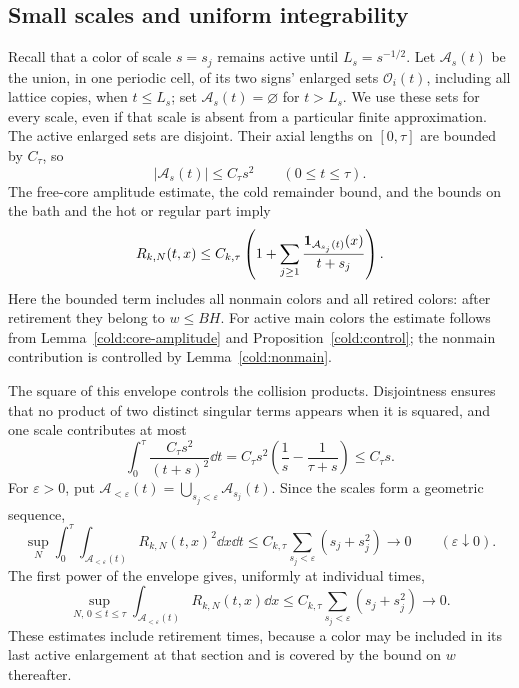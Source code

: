\subsection{Small scales and uniform integrability}

Recall that a color of scale $s=s_j$ remains active until
$L_s=s^{-1/2}$. Let $\mathcal A_s(t)$ be the union, in one periodic
cell, of its two signs' enlarged sets $\mathcal O_i(t)$, including
all lattice copies, when $t\le L_s$; set
$\mathcal A_s(t)=\varnothing$ for $t>L_s$.
We use these sets for every scale, even if that scale is absent from a
particular finite approximation. The active enlarged sets are disjoint.
Their axial lengths on $[0,\tau]$ are bounded by $C_\tau$, so
\[
 |\mathcal A_s(t)|\le C_\tau s^2
 \qquad(0\le t\le\tau).
\]
The free-core amplitude estimate, the cold remainder bound, and the
bounds on the bath and the hot or regular part imply
\begin{equation}\label{comp:moment-envelope}
 R_{k,N}(t,x)\le C_{k,\tau}
 \left(1+\sum_{j\ge1}
       \frac{\mathbf 1_{\mathcal A_{s_j}(t)}(x)}{t+s_j}\right).
\end{equation}
Here the bounded term includes all nonmain colors and all retired
colors: after retirement they belong to $w\le BH$.
For active main colors the estimate follows from
Lemma~\ref{cold:core-amplitude} and Proposition~\ref{cold:control};
the nonmain contribution is controlled by Lemma~\ref{cold:nonmain}.

The square of this envelope controls the collision products.
Disjointness ensures that no product of two distinct singular terms
appears when it is squared, and one scale contributes at most
\begin{equation}\label{comp:annular-square}
 \int_0^\tau\frac{C_\tau s^2}{(t+s)^2}\dd t
 =C_\tau s^2\left(\frac1s-\frac1{\tau+s}\right)
 \le C_\tau s.
\end{equation}
For $\varepsilon>0$, put
$\mathcal A_{<\varepsilon}(t)=
\bigcup_{s_j<\varepsilon}\mathcal A_{s_j}(t)$.
Since the scales form a geometric sequence,
\begin{equation}\label{comp:small-annuli}
 \sup_N\int_0^\tau\!\int_{\mathcal A_{<\varepsilon}(t)}
          R_{k,N}(t,x)^2\dd x\dd t
 \le C_{k,\tau}\sum_{s_j<\varepsilon}(s_j+s_j^2)
 \longrightarrow0
 \qquad(\varepsilon\downarrow0).
\end{equation}
The first power of the envelope gives, uniformly at individual times,
\begin{equation}\label{comp:fixed-time-small}
 \sup_{N,\,0\le t\le\tau}
 \int_{\mathcal A_{<\varepsilon}(t)}R_{k,N}(t,x)\dd x
 \le C_{k,\tau}\sum_{s_j<\varepsilon}(s_j+s_j^2)
 \longrightarrow0.
\end{equation}
These estimates include retirement times, because a color may be
included in its last active enlargement at that section and is covered
by the bound on $w$ thereafter.

